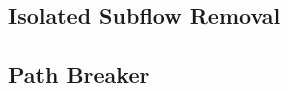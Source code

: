 

\subsection{Isolated Subflow Removal}\label{subsection:IsolatedSubflowRemoval}



\subsection{Path Breaker}\label{subsection:PathBreaker}

